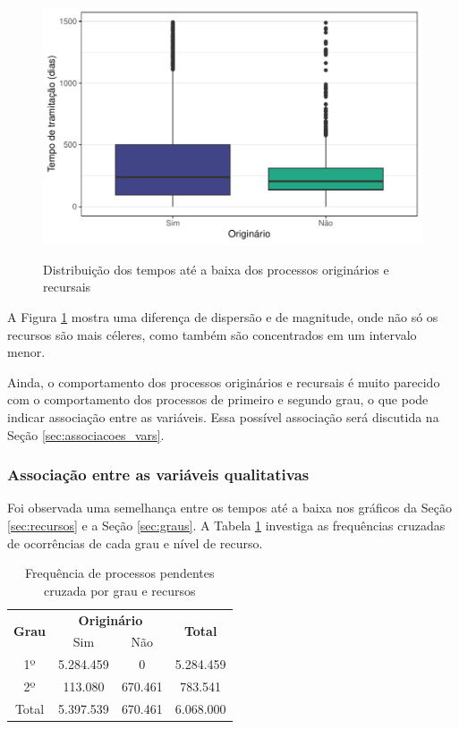 \begin{figure}[H]
    \centering
    \caption{Distribuição dos tempos até a baixa dos processos originários e recursais}
   \includegraphics[scale=1]{imagens/originario.pdf}
    \label{fig:originario}
\end{figure}

A Figura \ref{fig:originario} mostra uma diferença de dispersão e de magnitude, onde não só os recursos são mais céleres, como também são concentrados em um intervalo menor.

Ainda, o comportamento dos processos originários e recursais é muito parecido com o comportamento dos processos de primeiro e segundo grau, o que pode indicar associação entre as variáveis. Essa possível associação será discutida na Seção \ref{sec:associacoes_vars}.


\subsubsection{Associação entre as variáveis qualitativas\label{sec:associacoes_vars}}
Foi observada uma semelhança entre os tempos até a baixa nos gráficos da Seção \ref{sec:recursos} e a Seção \ref{sec:graus}.  A Tabela \ref{tbl:originario_grau} investiga as frequências cruzadas de ocorrências de cada grau e nível de recurso.

\begin{table}[H]
\centering
\caption{Frequência de processos pendentes cruzada por grau e recursos}
\begin{tabular}{c|cc|c}
\hline
\multirow{2}{*}{\textbf{Grau}} & \multicolumn{2}{c|}{\textbf{Originário}} & \multirow{2}{*}{\textbf{Total}} \\ 
\cline{2-3}
 & Sim & Não \\ 
  \hline
1º & 5.284.459 &   0  & 5.284.459 \\ 
2º & 113.080 & 670.461 & 783.541 \\ 
   \hline
  Total & 5.397.539 & 670.461 & 6.068.000 \\ 
\hline
\end{tabular}
\label{tbl:originario_grau}
\end{table}

